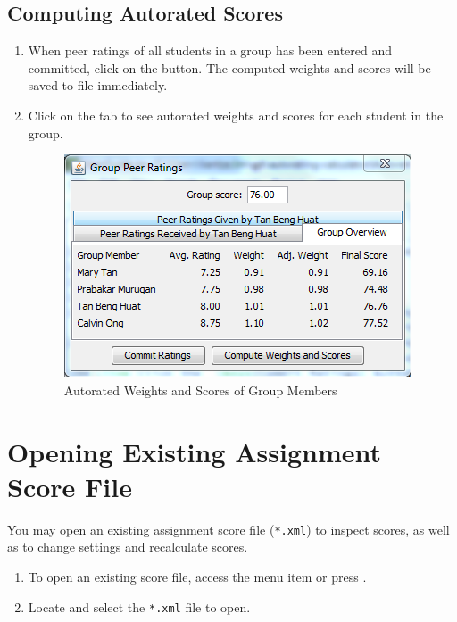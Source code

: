 \documentclass[a4paper,11pt]{refart}
\begin{document}
\subsection{Computing Autorated Scores}
\begin{enumerate}
\item When peer ratings of all students in a group has been entered and committed, click on the  button. The computed weights and scores will be saved to file immediately.
\item Click on the  tab to see autorated weights and scores for each student in the group.

\begin{figure}[hbt!]
\includegraphics[width=\textwidth]{groupoverview.png}
\caption{Autorated Weights and Scores of Group Members}
\end{figure}

\end{enumerate}

\section{Opening Existing Assignment Score File}
You may open an existing assignment score file (\texttt{*.xml}) to inspect scores, as well as to change settings and recalculate scores.
\begin{enumerate}
\item To open an existing score file, access the menu item  or press .
\item Locate and select the \texttt{*.xml} file to open.
\end{enumerate}
\end{document}
